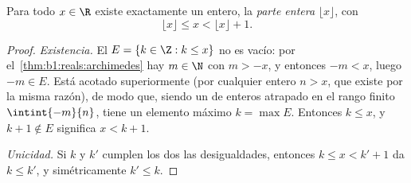 \begin{theorem}\label{thm:b1:reals:floor}
Para todo $x \in \R$ existe exactamente un entero, la \emph{parte
entera} $\lfloor x \rfloor$, con
\[
\lfloor x \rfloor \leq x < \lfloor x \rfloor + 1 .
\]
\end{theorem}

\begin{proof}
\emph{Existencia.} El  $E = \{k \in \Z : k \leq x\}$ no es
vacío: por el~\cref{thm:b1:reals:archimedes} hay $m \in \N$ con
$m > -x$, y entonces $-m < x$, luego $-m \in E$. Está acotado
superiormente (por cualquier entero $n > x$, que existe por la misma
razón), de modo que, siendo un  de enteros atrapado en el rango
finito $\intint{-m}{n}$, tiene un elemento máximo $k = \max E$.
Entonces $k \leq x$, y $k + 1 \notin E$ significa $x < k + 1$.

\emph{Unicidad.} Si $k$ y $k'$ cumplen los dos las desigualdades,
entonces $k \leq x < k' + 1$ da $k \leq k'$, y simétricamente
$k' \leq k$.
\end{proof}

